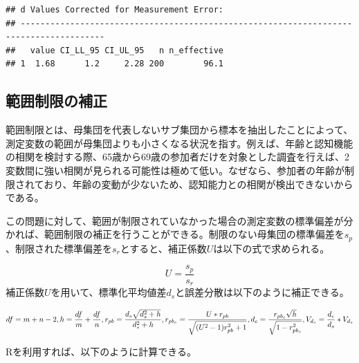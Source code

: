 \documentclass[
  ja=standard, xelatex, base=12pt]{bxjsreport}
\begin{document}
\begin{verbatim}
## d Values Corrected for Measurement Error:
## ---------------------------------------------------------------------------------------
##   value CI_LL_95 CI_UL_95   n n_effective
## 1  1.68      1.2     2.28 200        96.1
\end{verbatim}

\hypertarget{ux7bc4ux56f2ux5236ux9650ux306eux88dcux6b63}{%
\subsection{範囲制限の補正}\label{ux7bc4ux56f2ux5236ux9650ux306eux88dcux6b63}}

範囲制限とは、母集団を代表しないサブ集団から標本を抽出したことによって、測定変数の範囲が母集団よりも小さくなる状況を指す。例えば、年齢と認知機能の相関を検討する際、65歳から69歳の参加者だけを対象とした調査を行えば、2変数間に強い相関が見られる可能性は極めて低い。なぜなら、参加者の年齢が制限されており、年齢の変動が少ないため、認知能力との相関が検出できないからである。

この問題に対して、範囲が制限されていなかった場合の測定変数の標準偏差が分かれば、範囲制限の補正を行うことができる。制限のない母集団の標準偏差を\(s_p\)、制限された標準偏差を\(s_r\)とすると、補正係数\(U\)は以下の式で求められる。

\[
U=\frac{s_p}{s_r}
\] 補正係数\(U\)を用いて、標準化平均値差\(d_s\)と誤差分散は以下のように補正できる。

\[
df=m+n-2, \\
h=\frac{df}{m}+\frac{df}{n},  \\
r_{pb}=\frac{d_s\sqrt{d_s^2+h}}{d_s^2+h}, \\
r_{pb_c}=\frac{U*r_{pb}}{\sqrt{(U^2-1)r_{pb}^2+1}},\\
d_c=\frac{r_{pb_c}\sqrt{h}}{\sqrt{1-r_{pb_c}^2}}, \\
V_{d_c}=\frac{d_c}{d_s}*V_{d_s}
\]

Rを利用すれば、以下のように計算できる。
\end{document}

